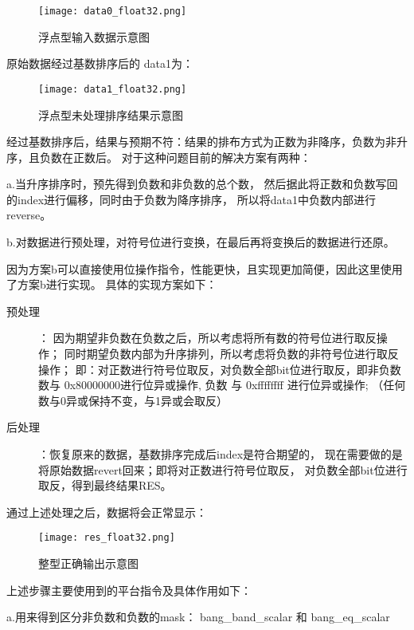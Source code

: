 \begin{figure}[ht]
    \centering
    \texttt{[image: data0\_float32.png]}
    \caption{浮点型输入数据示意图}
    \label{fig:data0}
\end{figure}


原始数据经过基数排序后的 data1为：

\begin{figure}[ht]
    \centering
    \texttt{[image: data1\_float32.png]}
    \caption{浮点型未处理排序结果示意图}
    \label{fig:data1}
\end{figure}


经过基数排序后，结果与预期不符：结果的排布方式为正数为非降序，负数为非升序，且负数在正数后。
对于这种问题目前的解决方案有两种：

a.当升序排序时，预先得到负数和非负数的总个数，
然后据此将正数和负数写回的index进行偏移，同时由于负数为降序排序，
所以将data1中负数内部进行reverse。 

b.对数据进行预处理，对符号位进行变换，在最后再将变换后的数据进行还原。

因为方案b可以直接使用位操作指令，性能更快，且实现更加简便，因此这里使用了方案b进行实现。
具体的实现方案如下：
\begin{description}
\item[预处理]：
因为期望非负数在负数之后，所以考虑将所有数的符号位进行取反操作；
同时期望负数内部为升序排列，所以考虑将负数的非符号位进行取反操作；
即：对正数进行符号位取反，对负数全部bit位进行取反，即非负数数与 0x80000000进行位异或操作, 
负数 与 0xffffffff 进行位异或操作; （任何数与0异或保持不变，与1异或会取反）

\item[后处理]：恢复原来的数据，基数排序完成后index是符合期望的，
现在需要做的是将原始数据revert回来；即将对正数进行符号位取反，
对负数全部bit位进行取反，得到最终结果RES。
\end{description}


通过上述处理之后，数据将会正常显示：

\begin{figure}[ht]
    \centering
    \texttt{[image: res\_float32.png]}
    \caption{整型正确输出示意图}
    \label{fig:res_float32}
\end{figure}


上述步骤主要使用到的平台指令及具体作用如下：

a.用来得到区分非负数和负数的mask： bang\_band\_scalar 和 bang\_eq\_scalar


